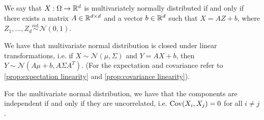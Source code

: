 \begin{lemma} \label{lem:multinormal}
    We say that $X: \Omega \to \mathbb{R}^d$ is multivariately normally distributed if and only if there exists a matrix $A \in \mathbb{R}^{d \times d}$ and a vector $b \in \mathbb{R}^d$ such that $X = A Z + b$, where $Z_1, ..., Z_d \overset{iid.}{\sim} \mathcal{N}(0, 1)$.
    
    We have that multivariate normal distribution is closed under linear transformations, i.e. if $X \sim \mathcal{N}(\mu, \Sigma)$ and $Y = AX + b$, then $Y \sim \mathcal{N}(A\mu + b, A \Sigma A^T)$. (For the expectation and covariance refer to \ref{prop:expectation linearity} and \ref{prop:covariance linearity}).
\end{lemma}
\begin{lemma} \label{lem:multivariate independence}
    For the multivariate normal distribution, we have that the components are independent if and only if they are uncorrelated, i.e. $\operatorname{Cov}(X_i, X_j) = 0$ for all $i \neq j$.
\end{lemma}

